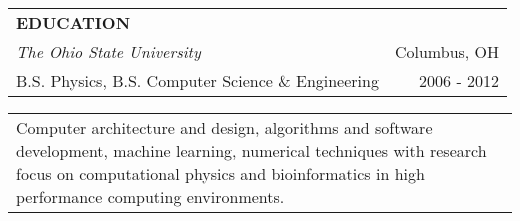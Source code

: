 \begin{tabularx}{\textwidth}{ L R }
  \textbf{EDUCATION} & \\
  \textit{The Ohio State University} & Columbus, OH \\
  B.S. Physics, B.S. Computer Science \& Engineering & 2006 - 2012 \\
\end{tabularx}
\begin{tabularx}{\textwidth}{ L }
  \small{Computer architecture and design, algorithms and software development, machine learning, numerical techniques with research focus on computational physics and bioinformatics in high performance computing environments.} \\
\end{tabularx}
